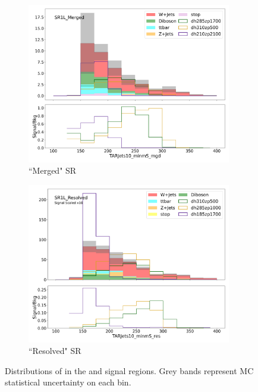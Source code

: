 \begin{figure}[htbp]
  \centering

     \begin{subfigure}{0.49\textwidth}
     \includegraphics[width = 0.98\textwidth]{Figures/5/ms/SR1L_Merged/TARJets10_minmS_mgd.png}
     \caption{``Merged" SR}
     \end{subfigure}
     \begin{subfigure}{0.49\textwidth}
     \includegraphics[width = 0.98\textwidth]{Figures/5/ms/SR1L_Resolved/TARJets10_minmS_res.png}
     \caption{``Resolved" SR}
     \end{subfigure}

     \caption{Distributions of \minms in the \merged and \resolved signal regions. Grey bands represent MC statistical uncertainty on each bin.}
     \label{fig:ms}
  \end{figure}
\FloatBarrier
